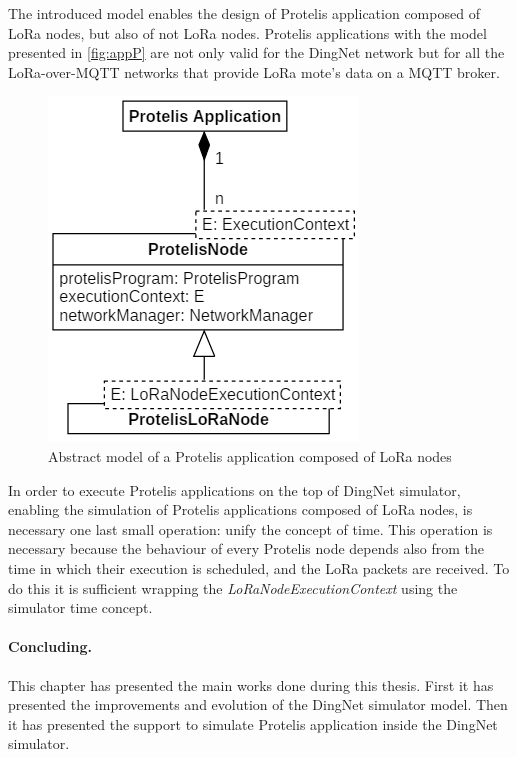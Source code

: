 % 
The introduced model enables the design of Protelis application composed of LoRa nodes, but also of not LoRa nodes.
Protelis applications with the model presented in \autoref{fig:appP} are not only valid for the DingNet network but for all the LoRa-over-MQTT networks that provide LoRa mote's data on a MQTT broker.
% 
\begin{figure}[H]
    \centering
    \includegraphics{figures/app.png}
    \caption{Abstract model of a Protelis application composed of LoRa nodes}
    \label{fig:appP}
\end{figure}
% 
\noindent In order to execute Protelis applications on the top of DingNet simulator, enabling the simulation of Protelis applications composed of LoRa nodes, is necessary one last small operation: unify the concept of time. 
This operation is necessary because the behaviour of every Protelis node depends also from the time in which their execution is scheduled, and the LoRa packets are received.
To do this it is sufficient wrapping the \mbox{\textit{LoRaNodeExecutionContext}} using the simulator time concept.

\paragraph{Concluding.} This chapter has presented the main works done during this thesis. First it has presented the improvements and evolution of the DingNet simulator model. Then it has presented the support to simulate Protelis application inside the DingNet simulator. 